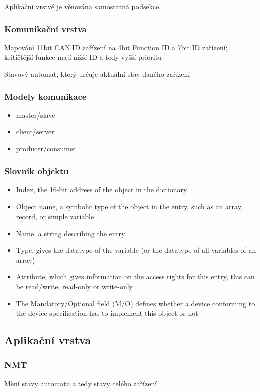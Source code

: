 \documentclass[
  field=ainfk,
  biblatex,
  glossaries,
  index
]{kidiplom}
\begin{document}
Aplikační vrstvě je věnována samostatná podsekce.

\subsubsection{Komunikační vrstva}

Mapování 11bit CAN ID zařízení na 4bit Function ID a 7bit ID zařízení; kritičtější funkce mají nižší ID a tedy vyšší prioritu

Stavový automat, který určuje aktuální stav daného zařízení

\subsubsection{Modely komunikace}

\begin{itemize}
    \item master/slave
    \item client/server
    \item producer/consumer
\end{itemize}

\subsubsection{Slovník objektu}
\begin{itemize}
    \item Index, the 16-bit address of the object in the dictionary
    \item Object name, a symbolic type of the object in the entry, such as an array, record, or simple variable
    \item Name, a string describing the entry
    \item Type, gives the datatype of the variable (or the datatype of all variables of an array)
    \item Attribute, which gives information on the access rights for this entry, this can be read/write, read-only or write-only
    \item The Mandatory/Optional field (M/O) defines whether a device conforming to the device specification has to implement this object or not 
\end{itemize}

\subsection{Aplikační vrstva}

\subsubsection{NMT}
Mění stavy automatu a tedy stavy celého zařízení
\end{document}
